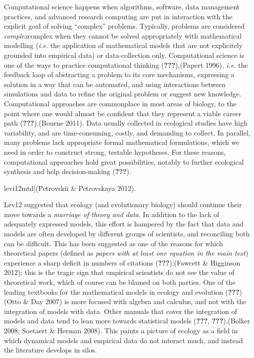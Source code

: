 \documentclass[11pt,serif]{article}
\begin{document}
Computational science happens when algorithms, software, data management
practices, and advanced research computing are put in interaction with
the explicit goal of solving ``complex'' problems. Typically, problems
are considered
\color{gray}\emph{complex}\color{black}\color{purple}complex\color{black}
when they cannot be solved appropriately with
\color{purple}mathematical\color{black} modelling
\color{purple}(\emph{i.e.} the application of mathematical models that
are not explicitely grounded\color{black} \color{purple}into empirical
data)\color{black} or data-collection only. Computational science is one
of the ways to practice computational thinking
\color{gray}({\textbf{???}}),\color{black}\color{purple}(Papert
1996),\color{black} \emph{i.e.} the feedback loop of abstracting a
problem to its core mechanisms, expressing a solution in a way that can
be automated, and using interactions between simulations and data to
refine the original problem or suggest new knowledge. Computational
approaches are commonplace in most areas of biology, to the point where
one would almost be confident that they represent a viable career path
\color{gray}({\textbf{???}}).\color{black}\color{purple}(Bourne
2011).\color{black} Data usually collected in ecological studies have
high variability, and are time-consuming, costly, and demanding to
collect. In parallel, many problems lack appropriate formal mathematical
formulations, which we need in order to construct strong, testable
hypotheses. For these reasons, computational approaches hold great
possibilities, notably to further ecological synthesis and help
decision-making \color{gray}({\textbf{???}}).\color{black}

\color{gray}{[}levi12mtd{]}\color{black}\color{purple}(Petrovskii \&
Petrovskaya 2012).\color{black}

\color{purple}Lev12\color{black} suggested that ecology (and
evolutionary biology) should continue their move towards a
\emph{marriage of theory and data}. In addition to the lack of
adequately expressed models, this effort is hampered by the fact that
data and models are often developed by different groups of scientists,
and reconciling both can be difficult. This has been suggested as one of
the reasons for which theoretical papers (defined as \emph{papers with
at least one equation in the main text}) experience a sharp deficit in
numbers of citations
\color{gray}({\textbf{???}});\color{black}\color{purple}(Fawcett \&
Higginson 2012);\color{black} this is the tragic sign that empirical
scientists do not see the value of theoretical work, which of course can
be blamed on both parties. One of the leading textbooks for the
mathematical models in ecology and evolution
\color{gray}({\textbf{???}})\color{black}\color{purple}(Otto \& Day
2007)\color{black} is more focused with algebra and calculus, and not
with the integration of models with data. Other manuals that cover the
integration of models and data tend to lean more towards statistical
models \color{gray}({\textbf{???}},
{\textbf{???}}).\color{black}\color{purple}(Bolker 2008; Soetaert \&
Herman 2008).\color{black} This paints a picture of ecology as a field
in which dynamical models and empirical data do not interact much, and
instead the literature develops in silos.
\end{document}
